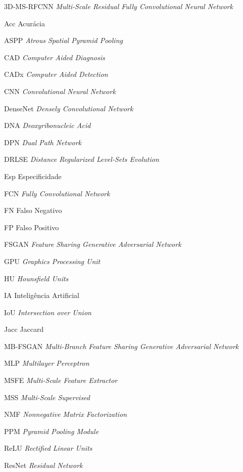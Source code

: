 \documentclass[
	12pt,				%
	openright,			%
	oneside,			%
	a4paper,			%
	chapter=TITLE,		%
	english,			%
	french,				%
	spanish,			%
	brazil				%
	]{abntex2}
\begin{document}
\begin{siglas}
    \item[3D-MS-RFCNN] \textit{Multi-Scale Residual Fully Convolutional Neural Network}
    \item[Acc] Acurácia
    \item[ASPP] \textit{Atrous Spatial Pyramid Pooling}
    \item[CAD] \textit{Computer Aided Diagnosis}
    \item[CADx] \textit{Computer Aided Detection}
    \item[CNN] \textit{Convolutional Neural Network}
    \item[DenseNet] \textit{Densely Convolutional Network}
    \item[DNA] \textit{Deoxyribonucleic Acid}
    \item[DPN] \textit{Dual Path Network}
    \item[DRLSE] \textit{Distance Regularized Level-Sets Evolution}
    \item[Esp] Especificidade
    \item[FCN] \textit{Fully Convolutional Network}
    \item[FN] Falso Negativo
    \item[FP] Falso Positivo
    \item[FSGAN] \textit{Feature Sharing Generative Adversarial Network}
    \item[GPU] \textit{Graphics Processing Unit}
    \item[HU] \textit{Hounsfield Units}
    \item[IA] Inteligência Artificial
    \item[IoU] \textit{Intersection over Union}
    \item[Jacc] Jaccard
    \item[MB-FSGAN] \textit{Multi-Branch Feature Sharing Generative Adversarial Network}
    \item[MLP] \textit{Multilayer Perceptron}
    \item[MSFE] \textit{Multi-Scale Feature Extractor}
    \item[MSS] \textit{Multi-Scale Supervised}
    \item[NMF] \textit{Nonnegative Matrix Factorization}
    \item[PPM] \textit{Pyramid Pooling Module}
    \item[ReLU] \textit{Rectified Linear Units}
    \item[ResNet] \textit{Residual Network}

\end{siglas}
\end{document}

